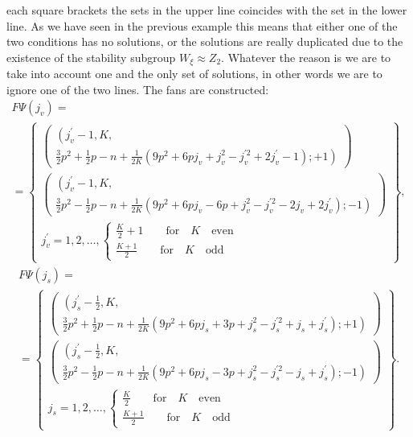 \documentclass{article}
\begin{document}
each square brackets the sets in the upper line coincides with the set in
the lower line. As we have seen in the previous example this means that
either one of the two conditions has no solutions, or the solutions are
really duplicated due to the existence of the stability subgroup $W_{\xi
}\approx Z_{2}$. Whatever the reason is we are to take into account one and
the only set of solutions, in other words we are to ignore one of the two
lines. The fans are constructed: 
\begin{multline*}
F\Psi \left( j_{v}\right) = \\
=\left\{ 
\begin{array}{c}
\left( 
\begin{array}{c}
\left( {}\right. j_{v}^{\prime }-1,K, \\ 
\frac{3}{2}p^{2}+\frac{1}{2}p-n+\frac{1}{2K}\left(
9p^{2}+6pj_{v}+j_{v}^{2}-j_{v}^{\prime 2}+2j_{v}^{\prime }-1\right)
;+1\left. {}\right)
\end{array}
\right) \\ 
\left( 
\begin{array}{c}
\left( {}\right. j_{v}^{\prime }-1,K, \\ 
\frac{3}{2}p^{2}-\frac{1}{2}p-n+\frac{1}{2K}\left(
9p^{2}+6pj_{v}-6p+j_{v}^{2}-j_{v}^{\prime 2}-2j_{v}+2j_{v}^{\prime }\right)
;-1\left. {}\right)
\end{array}
\right) \\ 
j_{v}^{\prime }=1,2,\ldots ,\left\{ 
\begin{array}{c}
\frac{K}{2}+1\qquad \mathrm{for\quad }K\mathrm{\quad even} \\ 
\frac{K+1}{2}\qquad \mathrm{for\quad }K\mathrm{\quad odd}
\end{array}
\right.
\end{array}
\right\} ,
\end{multline*}
\begin{multline*}
F\Psi \left( j_{s}\right) = \\
=\left\{ 
\begin{array}{c}
\left( 
\begin{array}{c}
\left( {}\right. j_{s}^{\prime }-\frac{1}{2},K, \\ 
\frac{3}{2}p^{2}+\frac{1}{2}p-n+\frac{1}{2K}\left(
9p^{2}+6pj_{s}+3p+j_{s}^{2}-j_{s}^{\prime 2}+j_{s}+j_{s}^{\prime }\right)
;+1\left. {}\right)
\end{array}
\right) \\ 
\left( 
\begin{array}{c}
\left( {}\right. j_{s}^{\prime }-\frac{1}{2},K, \\ 
\frac{3}{2}p^{2}-\frac{1}{2}p-n+\frac{1}{2K}\left(
9p^{2}+6pj_{s}-3p+j_{s}^{2}-j_{s}^{\prime 2}-j_{s}+j_{s}^{\prime }\right)
;-1\left. {}\right)
\end{array}
\right) \\ 
j_{s}=1,2,\ldots ,\left\{ 
\begin{array}{c}
\frac{K}{2}\qquad \mathrm{for\quad }K\mathrm{\quad even} \\ 
\frac{K+1}{2}\qquad \mathrm{for\quad }K\mathrm{\quad odd}
\end{array}
\right.
\end{array}
\right\} .
\end{multline*}
\end{document}
